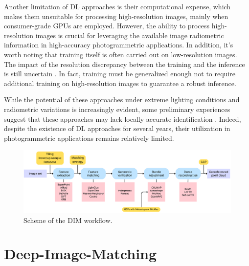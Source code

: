 Another limitation of DL approaches is their computational expense, which makes them unsuitable for processing high-resolution images, mainly when consumer-grade GPUs are employed. 
However, the ability to process high-resolution images is crucial for leveraging the available image radiometric information in high-accuracy photogrammetric applications.
In addition, it's worth noting that training itself is often carried out on low-resolution images. 
The impact of the resolution discrepancy between the training and the inference is still uncertain \cite{Wu2024_evaluation_dlstereo}.
In fact, training must be generalized enough not to require additional training on high-resolution images to guarantee a robust inference.

While the potential of these approaches under extreme lighting conditions and radiometric variations is increasingly evident, some preliminary experiences suggest that these approaches may lack locally accurate identification \cite{Morelli2024_dim}. 
Indeed, despite the existence of DL approaches for several years, their utilization in photogrammetric applications remains relatively limited. 

\begin{figure}[ht]
    \centering
    \includegraphics[width=1\textwidth]{dim_workflow_simple}
    \caption{Scheme of the DIM workflow.}
    \label{fig:5:dim_workflow}
\end{figure}

\section{Deep-Image-Matching}

